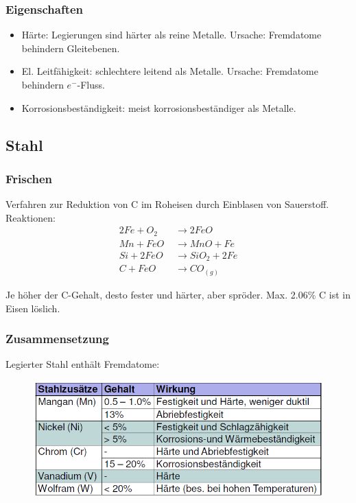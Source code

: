 \subsubsection{Eigenschaften}
\begin{itemize}
	\item Härte: Legierungen sind härter als reine Metalle. Ursache: Fremdatome behindern Gleitebenen.
	\item El. Leitfähigkeit: schlechtere leitend als Metalle. Ursache: Fremdatome behindern $e^-$-Fluss.
	\item Korrosionsbeständigkeit: meist korrosionsbeständiger als Metalle.
\end{itemize}

\subsection{Stahl}
\subsubsection{Frischen}
Verfahren zur Reduktion von C im Roheisen durch Einblasen von Sauerstoff. \\
Reaktionen:
\begin{eqnarray*}
	2 Fe + O_2 \quad &\rightarrow 2 FeO \\
	Mn + FeO &\rightarrow MnO + Fe \\
	Si + 2 FeO &\rightarrow SiO_2 + 2 Fe \\
	C + FeO &\rightarrow CO_{(g)}
\end{eqnarray*}

Je höher der C-Gehalt, desto fester und härter, aber spröder. Max. 2.06\% C ist in Eisen löslich. 

\subsubsection{Zusammensetzung}
Legierter Stahl enthält Fremdatome:

\begin{figure}[htbp]
	\centering
	\includegraphics[width=0.9\linewidth]{images/3_Stahl_Zusaetze.png}
\end{figure}

